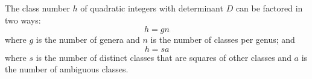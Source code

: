 The class number $h$ of quadratic integers with determinant $D$ can be factored in two ways:
$$h = gn$$
where $g$ is the number of genera and $n$ is the number of classes per genus; and
$$h = sa$$
where $s$ is the number of distinct classes that are squares of other classes and $a$ is the number of ambiguous classes.
